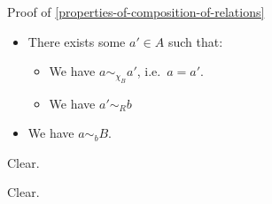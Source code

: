 \begin{Proof}{Proof of \cref{properties-of-composition-of-relations}}
\begin{itemize}
            \begin{itemize}
                \item There exists some $a'\in A$ such that:
                    \begin{itemize}
                        \item We have $a\sim_{\chi_{B}}a'$, i.e.\ $a=a'$.
                        \item We have $a'\sim_{R}b$
                    \end{itemize}
                \item We have $a\sim_{b}B$.
            \end{itemize}
    \end{itemize}

    Clear.

    Clear.
\end{Proof}
